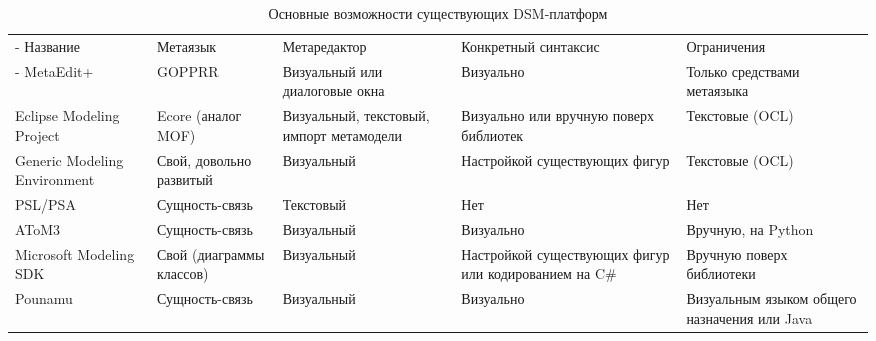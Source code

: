 \begin{table}[ht]
\begin{small}
	\begin{longtabu} {| X[1 l p] | X[1 l p] | X[1 l p] | X[1 l p] |X[1 l p] |}
		\caption{Основные возможности существующих DSM-платформ} \\
		\tabucline-
		 Название                    & Метаязык                        & Метаредактор                                                     & Конкретный синтаксис                                     & Ограничения                                    \\
		\tabucline-
		\everyrow{\tabucline-}
		MetaEdit+                    & GOPPRR                          & Визуальный или диалоговые окна                                   & Визуально                                                & Только средствами метаязыка                    \\
		Eclipse Modeling Project     & Ecore (аналог MOF)              & Визуальный, текстовый, импорт метамодели                         & Визуально или вручную поверх библиотек                   & Текстовые (OCL)                                \\
		Generic Modeling Environment & Свой, довольно развитый         & Визуальный                                                       & Настройкой существующих фигур                            & Текстовые (OCL)                                \\
		PSL/PSA                      & Сущность-связь                  & Текстовый                                                        & Нет                                                      & Нет                                            \\
		AToM3                        & Сущность-связь                  & Визуальный                                                       & Визуально                                                & Вручную, на Python                             \\
		Microsoft Modeling SDK       & Свой (диаграммы классов)        & Визуальный                                                       & Настройкой существующих фигур или кодированием на C\#    & Вручную поверх библиотеки                      \\
		Pounamu                      & Сущность-связь                  & Визуальный                                                       & Визуально                                                & Визуальным языком общего назначения или Java   \\

\end{longtabu}
\end{small}
\end{table}

